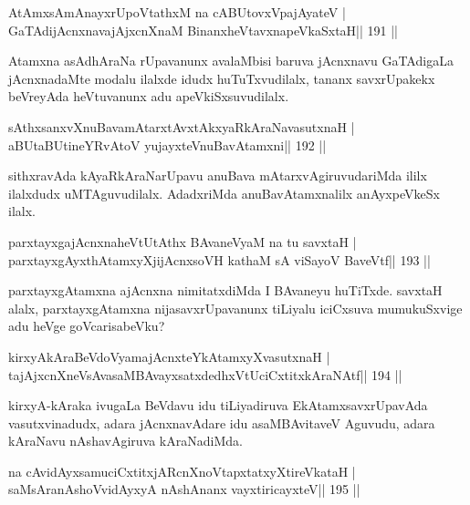 
\begin{shl}
AtAmxsAmAnayxrUpoVtathxM na cABUtovxVpajAyateV |
GaTAdijAcnxnavajAjxcnXnaM BinanxheVtavxnapeVkaSxtaH\hfill || 191 ||
\end{shl}

\begin{artha}
Atamxna asAdhAraNa rUpavanunx avalaMbisi baruva jAcnxnavu GaTAdigaLa jAcnxnadaMte modalu ilalxde idudx huTuTxvudilalx, tananx savxrUpakekx beVreyAda heVtuvanunx adu apeVkiSxsuvudilalx.
\end{artha}


\begin{shl}
sAthxsanxvXnuBavamAtarxtAvxtAkxyaRkAraNavasutxnaH |
aBUtaBUtineYRvAtoV yujayxteV\s nuBavAtamxni\hfill || 192 ||
\end{shl}

\begin{artha}
sithxravAda kAyaRkAraNarUpavu anuBava mAtarxvAgiruvudariMda ililx ilalxdudx uMTAguvudilalx. AdadxriMda anuBavAtamxnalilx anAyxpeVkeSx ilalx.
\end{artha}

\begin{shl}
parxtayxgajAcnxnaheVtUtAthx BAvaneVyaM na tu savxtaH |
parxtayxgAyxthAtamxyXjijAcnxsoVH kathaM sA viSayoV BaveVtf\hfill || 193 ||
\end{shl}

\begin{artha}
parxtayxgAtamxna ajAcnxna nimitatxdiMda I BAvaneyu huTiTxde. savxtaH alalx, parxtayxgAtamxna nijasavxrUpavanunx tiLiyalu iciCxsuva mumukuSxvige adu heVge goVcarisabeVku?
\end{artha}

\begin{shl}
kirxyAkAraBeVdoV\s yamajAcnxteYkAtamxyXvasutxnaH |
tajAjxcnXneV\s sAvasaMBAvayxsatxdedhxVtUciCxtitxkAraNAtf\hfill || 194 ||
\end{shl}

\begin{artha}
kirxyA-kAraka ivugaLa BeVdavu idu tiLiyadiruva EkAtamxsavxrUpavAda vasutxvinadudx, adara jAcnxnavAdare idu asaMBAvitaveV Aguvudu, adara kAraNavu nAshavAgiruva kAraNadiMda.
\end{artha}

\begin{shl}
na cAvidAyxsamuciCxtitxjARcnXnoVtapxtatxyXtireVkataH |
saMsAranAshoV\s vidAyxyA nAshAnanx vayxtiricayxteV\hfill || 195 ||
\end{shl}

